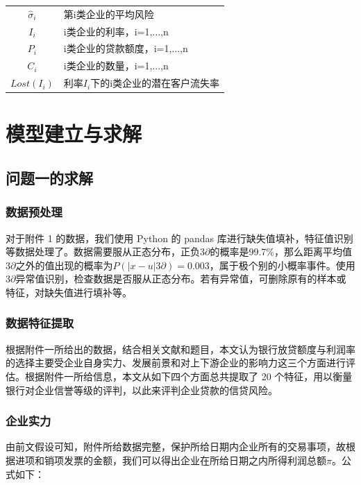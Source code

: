 \documentclass[UTF8]{ctexart}
\begin{document}
\begin{table}[H]
\begin{center}
\begin{tabular}{c|l}
			$\hat \sigma_i$                          & 第i类企业的平均风险                           \\
			$I_i$                                    & i类企业的利率，i=1,...,n                      \\
			$P_i$                                    & i类企业的贷款额度，i=1,...,n                  \\
			$C_i$                                    & i类企业的数量，i=1,...,n                      \\
			$Lost(I_i)$                              & 利率$I_i$下的i类企业的潜在客户流失率          \\
			\bottomrule[2pt]
		\end{tabular}
	\end{center}
\end{table}



\section{模型建立与求解}
\subsection{问题一的求解}
\subsubsection{数据预处理}
对于附件 1 的数据，我们使用 Python 的 pandas 库进行缺失值填补，特征值识别等数据处理了。数据需要服从正态分布，正负$3∂$的概率是99.7\%，那么距离平均值$3∂$之外的值出现的概率为$P(|x-u| 3∂) = 0.003$，属于极个别的小概率事件。使用$3∂$异常值识别，检查数据是否服从正态分布。若有异常值，可删除原有的样本或特征，对缺失值进行填补等。

\subsubsection{数据特征提取}
根据附件一所给出的数据，结合相关文献和题目，本文认为银行放贷额度与利润率的选择主要受企业自身实力、发展前景和对上下游企业的影响力这三个方面进行评估。根据附件一所给信息，本文从如下四个方面总共提取了 20 个特征，用以衡量银行对企业信誉等级的评判，以此来评判企业贷款的信贷风险。

\subsubsection{企业实力}
由前文假设可知，附件所给数据完整，保护所给日期内企业所有的交易事项，故根据进项和销项发票的金额，我们可以得出企业在所给日期之内所得利润总额$\pi$。公式如下：
\end{document}
